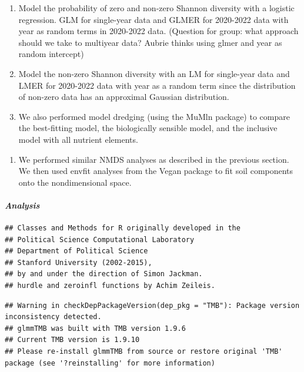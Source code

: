 \documentclass[
]{article}
\providecommand{\tightlist}{%
  \setlength{\itemsep}{0pt}\setlength{\parskip}{0pt}}
\begin{document}
\begin{enumerate}
\def\labelenumi{(\arabic{enumi})}
\tightlist
\item
  Model the probability of zero and non-zero Shannon diversity with a
  logistic regression. GLM for single-year data and GLMER for 2020-2022
  data with year as random terms in 2020-2022 data. (Question for group:
  what approach should we take to multiyear data? Aubrie thinks using
  glmer and year as random intercept)
\item
  Model the non-zero Shannon diversity with an LM for single-year data
  and LMER for 2020-2022 data with year as a random term since the
  distribution of non-zero data has an approximal Gaussian distribution.
\item
  We also performed model dredging (using the MuMln package) to compare
  the best-fitting model, the biologically sensible model, and the
  inclusive model with all nutrient elements.
\end{enumerate}

\begin{enumerate}
\def\labelenumi{\arabic{enumi}.}
\setcounter{enumi}{4}
\tightlist
\item
  We performed similar NMDS analyses as described in the previous
  section. We then used envfit analyses from the Vegan package to fit
  soil components onto the nondimensional space.
\end{enumerate}

\hypertarget{analysis-1}{%
\paragraph{\texorpdfstring{\emph{Analysis}}{Analysis }}\label{analysis-1}}

\begin{verbatim}
## Classes and Methods for R originally developed in the
## Political Science Computational Laboratory
## Department of Political Science
## Stanford University (2002-2015),
## by and under the direction of Simon Jackman.
## hurdle and zeroinfl functions by Achim Zeileis.
\end{verbatim}

\begin{verbatim}
## Warning in checkDepPackageVersion(dep_pkg = "TMB"): Package version inconsistency detected.
## glmmTMB was built with TMB version 1.9.6
## Current TMB version is 1.9.10
## Please re-install glmmTMB from source or restore original 'TMB' package (see '?reinstalling' for more information)
\end{verbatim}
\end{document}
